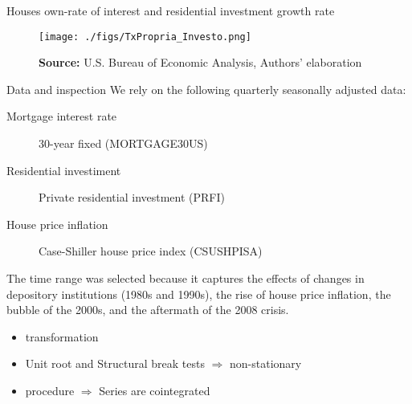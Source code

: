 \documentclass[10pt]{beamer}
\begin{document}
\begin{frame}[label={sec:org3e444bd}]{Houses own-rate of interest and residential investment growth rate}
\begin{figure}[htb]
	\centering
	\texttt{[image: ./figs/TxPropria\_Investo.png]}
	\caption*{\textbf{Source:} U.S. Bureau of Economic Analysis, Authors' elaboration}
\end{figure}
\end{frame}



\begin{frame}[label={sec:orgfbc40fe}]{Data and inspection}
\label{DataInspection}
We rely on the following quarterly seasonally adjusted data:
\begin{description}
\item[{Mortgage interest rate}] 30-year fixed (MORTGAGE30US)
\item[{Residential investiment}] Private residential investment (PRFI)
\item[{House price inflation}] Case-Shiller house price index (CSUSHPISA)
\end{description}

The time range was selected because it captures the effects of changes in depository institutions (1980s and 1990s), the rise of house price inflation, the bubble of the 2000s, and the aftermath of the 2008 crisis.

\begin{itemize}
\item \textcite{yeo_new_2000} transformation \hyperlink{YeoTransformation}{}
\item Unit root and Structural break tests \(\Rightarrow\) non-stationary \hyperlink{UnitTest}{}
\item \textcite{johansen_estimation_1991} procedure \(\Rightarrow\) Series are cointegrated \hyperlink{CointTest}{}
\end{itemize}
\end{frame}
\end{document}

